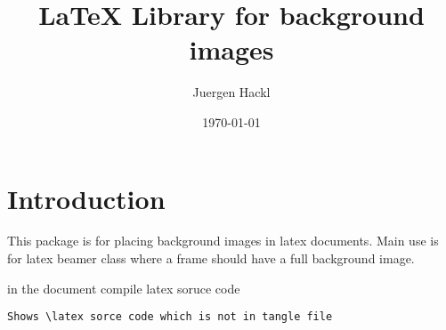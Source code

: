 \documentclass[11pt]{article}
\author{Juergen Hackl}
\date{\today}
\title{\LaTeX{} Library for background images}
\begin{document}
\maketitle
\tableofcontents


\section{Introduction}
\label{sec:orgec52808}

This package is for placing background images in latex documents. Main use is for latex beamer class where a frame should have a full background image.

in the document compile latex soruce code


\begin{verbatim}
Shows \latex sorce code which is not in tangle file
\end{verbatim}
\end{document}
